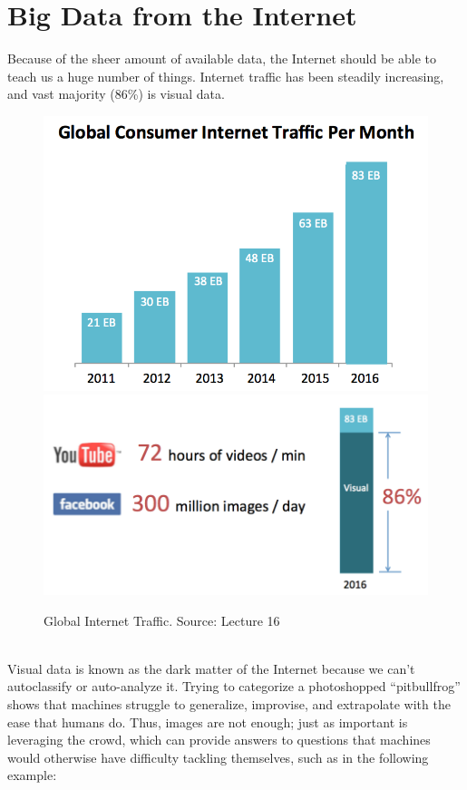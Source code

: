 \documentclass[11pt]{article}
\begin{document}
\section{Big Data from the Internet}
Because of the sheer amount of available data, the Internet should be able to teach us a huge number of things. Internet traffic has been steadily increasing, and vast majority (86\%) is visual data. \\
\begin{figure}[h]
  \centering
  \includegraphics[scale=0.6]{internettraffic.png}\includegraphics[scale=0.6]{fbyoutubedata.png}
  \caption{ Global Internet Traffic. Source: Lecture 16}
\end{figure}\\
Visual data is known as the dark matter of the Internet because we can't autoclassify or auto-analyze it. Trying to categorize a photoshopped ``pitbullfrog'' shows that machines struggle to generalize, improvise, and extrapolate with the ease that humans do. Thus, images are not enough; just as important is leveraging the crowd, which can provide answers to questions that machines would otherwise have difficulty tackling themselves, such as in the following example:\\
\end{document}
